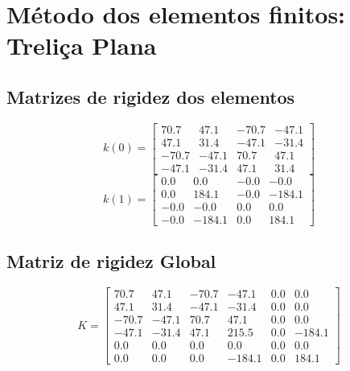 \documentclass{article}%
\begin{document}
%
\normalsize%
\section{Método dos elementos finitos: Treliça Plana}%
\label{sec:MtododoselementosfinitosTreliaPlana}%
\subsection{Matrizes de rigidez dos elementos}%
\label{subsec:Matrizesderigidezdoselementos}%
\[%
k(0)= \begin{bmatrix}%
70.7&47.1&-70.7&-47.1\\%
47.1&31.4&-47.1&-31.4\\%
-70.7&-47.1&70.7&47.1\\%
-47.1&-31.4&47.1&31.4%
\end{bmatrix}%
\]%
\[%
k(1)= \begin{bmatrix}%
0.0&0.0&-0.0&-0.0\\%
0.0&184.1&-0.0&-184.1\\%
-0.0&-0.0&0.0&0.0\\%
-0.0&-184.1&0.0&184.1%
\end{bmatrix}%
\]

%
\subsection{Matriz de rigidez Global}%
\label{subsec:MatrizderigidezGlobal}%
\[%
K= \begin{bmatrix}%
70.7&47.1&-70.7&-47.1&0.0&0.0\\%
47.1&31.4&-47.1&-31.4&0.0&0.0\\%
-70.7&-47.1&70.7&47.1&0.0&0.0\\%
-47.1&-31.4&47.1&215.5&0.0&-184.1\\%
0.0&0.0&0.0&0.0&0.0&0.0\\%
0.0&0.0&0.0&-184.1&0.0&184.1%
\end{bmatrix}%
\]

%
\end{document}
